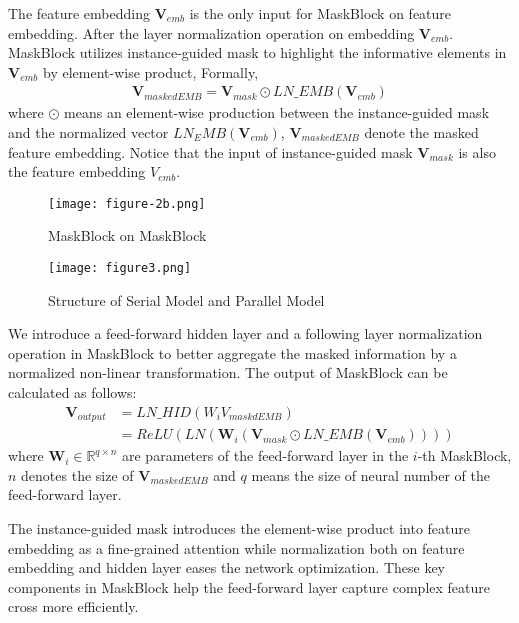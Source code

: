 \documentclass[sigconf]{acmart}
\begin{document}
The feature embedding $\mathbf{V}_{emb}$  is the only input for MaskBlock on feature embedding. After the layer normalization operation on embedding $\mathbf{V}_{emb}$. MaskBlock utilizes instance-guided mask to highlight the informative elements in $\mathbf{V}_{emb}$ by element-wise product, Formally,
\begin{equation}
  \begin{split}
  \mathbf{V}_{maskedEMB} = \mathbf{V}_{mask} \odot LN\_EMB(\mathbf{V}_{emb})
\end{split}
\end{equation}
 where $\odot$ means an element-wise production between the instance-guided mask and the normalized vector $LN_EMB(\mathbf{V}_{emb})$, $\mathbf{V}_{maskedEMB}$ denote the masked feature embedding. Notice that the input of instance-guided mask $\mathbf{V}_{mask}$ is also the feature embedding $V_{emb}$.


 \begin{figure}
   \setlength{\abovecaptionskip}{1pt}
   \texttt{[image: figure-2b.png]}
   \caption{MaskBlock on MaskBlock }
   \label{Fig.figure-2b}

 \end{figure}


 \begin{figure*}
   \setlength{\abovecaptionskip}{1pt}
   \texttt{[image: figure3.png]}
   \caption{Structure of Serial Model and Parallel Model}
   \label{Fig.Structure}
 \end{figure*}

We introduce  a feed-forward hidden layer and a following layer normalization operation in MaskBlock to better aggregate the masked information by a normalized non-linear transformation. The output of MaskBlock can be calculated as follows:
\begin{equation}
  \begin{split}
\mathbf{V}_{output} &= LN\_HID(W_iV_{maskdEMB}) \\
&= ReLU(LN(\mathbf{W}_i(\mathbf{V}_{mask} \odot LN\_EMB(\mathbf{V}_{emb}))))
\end{split}
\end{equation}
where $\mathbf{W}_i \in \mathbb{R}^{q \times n}$ are parameters of the feed-forward layer in the $i$-th MaskBlock, $n$ denotes the size of $\mathbf{V}_{maskedEMB}$ and $q$ means the size of neural number of the feed-forward layer.


 The instance-guided mask introduces the element-wise product  into feature embedding  as a fine-grained  attention while normalization both on feature embedding and hidden layer eases the network optimization. These key components  in MaskBlock help the feed-forward layer capture complex feature cross more efficiently.
\end{document}
